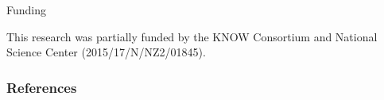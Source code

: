 \documentclass{beamer}\usepackage[]{graphicx}\usepackage[]{color}
\begin{document}
\begin{frame}{Funding}

This research was partially funded by the KNOW Consortium and National Science Center (2015/17/N/NZ2/01845).

\end{frame}



\begin{frame}[allowframebreaks]
        \frametitle{References}
  
  
\end{frame}  
\end{document}
